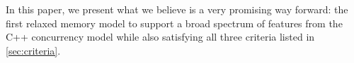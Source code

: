 In this paper, we present what we believe is a very promising way
forward: the first relaxed memory model to support a broad spectrum
of features from the C++ concurrency model while also satisfying all
three criteria listed in \cref{sec:criteria}.










